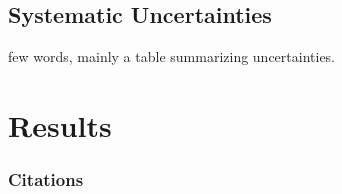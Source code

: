 \documentclass[%
 reprint,
 amsmath,amssymb,
 aps,
]{revtex4-1}
\begin{document}
\subsection{Systematic Uncertainties}

few words, mainly a table summarizing uncertainties.

\section{Results}


\subsubsection{Citations}
\end{document}

